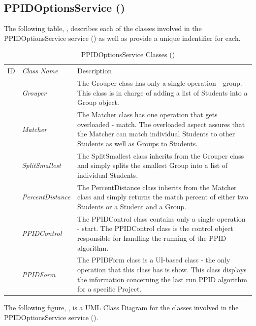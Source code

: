 \documentclass[12pt,letterpaper]{article}
\begin{document}
\subsection{PPIDOptionsService ()}

The following table, , describes each of the classes involved in the PPIDOptionsService service () as well as provide a unique indentifier for each.

\begin{table}[H]
	\caption{PPIDOptionsService Classes ()} 
	\begin{tabu} to 
	    \tableheader{}ID & Class Name & Description \\
		 & Grouper & The Grouper class has only a single operation - group. This class is in charge of adding a list of Students into a Group object.\\
		 & Matcher & The Matcher class has one operation that gets overloaded - match. The overloaded aspect assures that the Matcher can match individual Students to other Students as well as Groups to Students.\\
		 & SplitSmallest & The SplitSmallest class inherits from the Grouper class and simply splits the smallest Group into a list of individual Students.\\
		 & PercentDistance & The PercentDistance class inherits from the Matcher class and simply returns the match percent of either two Students or a Student and a Group.\\
		 & PPIDControl & The PPIDControl class contains only a single operation - start. The PPIDControl class is the control object responsible for handling the running of the PPID algorithm.\\
		 & PPIDForm & The PPIDForm class is a UI-based class - the only operation that this class has is show. This class displays the information concerning the last run PPID algorithm for a specific Project.\\
	\end{tabu}
\end{table}

The following figure, , is a UML Class Diagram for the classes involved in the PPIDOptionsService service ().
\end{document}
